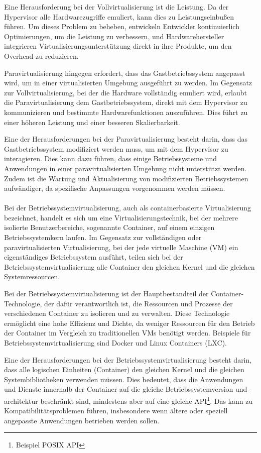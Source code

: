 Eine Herausforderung bei der Vollvirtualisierung ist die Leistung. Da der Hypervisor alle Hardwarezugriffe emuliert, kann dies zu Leistungseinbußen führen. Um dieses Problem zu beheben, entwickeln Entwickler kontinuierlich Optimierungen, um die Leistung zu verbessern, und Hardwarehersteller integrieren Virtualisierungsunterstützung direkt in ihre Produkte, um den Overhead zu reduzieren.

Paravirtualisierung hingegen erfordert, dass das Gastbetriebssystem angepasst wird, um in einer virtualisierten Umgebung ausgeführt zu werden. Im Gegensatz zur Vollvirtualisierung, bei der die Hardware vollständig emuliert wird, erlaubt die Paravirtualisierung dem Gastbetriebssystem, direkt mit dem Hypervisor zu kommunizieren und bestimmte Hardwarefunktionen auszuführen. Dies führt zu einer höheren Leistung und einer besseren Skalierbarkeit.

Eine der Herausforderungen bei der Paravirtualisierung besteht darin, dass das Gastbetriebssystem modifiziert werden muss, um mit dem Hypervisor zu interagieren. Dies kann dazu führen, dass einige Betriebssysteme und Anwendungen in einer paravirtualisierten Umgebung nicht unterstützt werden. Zudem ist die Wartung und Aktualisierung von modifizierten Betriebssystemen aufwändiger, da spezifische Anpassungen vorgenommen werden müssen.
\\\\
Bei der Betriebssystemvirtualisierung, auch als containerbasierte Virtualisierung bezeichnet, handelt es sich um eine Virtualisierungstechnik, bei der mehrere isolierte Benutzerbereiche, sogenannte Container, auf einem einzigen Betriebssystemkern laufen. Im Gegensatz zur vollständigen oder paravirtualisierten Virtualisierung, bei der jede virtuelle Maschine (VM) ein eigenständiges Betriebssystem ausführt, teilen sich bei der Betriebssystemvirtualisierung alle Container den gleichen Kernel und die gleichen Systemressourcen.

Bei der Betriebssystemvirtualisierung ist der Hauptbestandteil der Container-Technologie, der dafür verantwortlich ist, die Ressourcen und Prozesse der verschiedenen Container zu isolieren und zu verwalten. Diese Technologie ermöglicht eine hohe Effizienz und Dichte, da weniger Ressourcen für den Betrieb der Container im Vergleich zu traditionellen VMs benötigt werden. Beispiele für Betriebssystemvirtualisierung sind Docker und Linux Containers (LXC).

Eine der Herausforderungen bei der Betriebssystemvirtualisierung besteht darin, dass alle logischen Einheiten (Container) den gleichen Kernel und die gleichen Systembibliotheken verwenden müssen. Dies bedeutet, dass die Anwendungen und Dienste innerhalb der Container auf die gleiche Betriebssystemversion und -architektur beschränkt sind, mindestens aber auf eine gleiche API\footnote{Beispiel POSIX API}. Das kann zu Kompatibilitätsproblemen führen, insbesondere wenn ältere oder speziell angepasste Anwendungen betrieben werden sollen.

